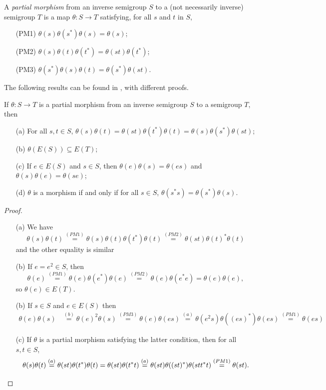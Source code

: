 \begin{definition}\label{definitionpartialmorphism}
A \emph{partial morphism} from an inverse semigroup $S$ to a (not necessarily inverse) semigroup $T$ is a map $\theta: S \rightarrow T$ satisfying, for all $s$ and $t$ in $S$,
\begin{enumerate}
\item[(PM1)] $\theta(s)\theta(s^*)\theta(s)=\theta(s)$;
\item[(PM2)] $\theta(s)\theta(t)\theta(t^*)=\theta(st)\theta(t^*)$;
\item[(PM3)] $\theta(s^*)\theta(s)\theta(t)=\theta(s^*)\theta(st)$.
\end{enumerate}
\end{definition}

The following results can be found in \cite{MR3231479}, with different proofs.

\begin{proposition}\label{propositioninitialpropertiesofpartialmorphisms}
If $\theta:S\to T$ is a partial morphism from an inverse semigroup $S$ to a semigroup $T$, then
\begin{enumerate}
\item[(a)] For all $s,t\in S$, $\theta(s)\theta(t)=\theta(st)\theta(t^*)\theta(t)=\theta(s)\theta(s^*)\theta(st)$;
\item[(b)] $\theta(E(S))\subseteq E(T)$;
\item[(c)] If $e\in E(S)$ and $s\in S$, then $\theta(e)\theta(s)=\theta(es)$ and $\theta(s)\theta(e)=\theta(se)$;
\item[(d)] $\theta$ is a morphism if and only if for all $s\in S$, $\theta(s^*s)=\theta(s^*)\theta(s)$.
\end{enumerate}
\end{proposition}
\begin{proof}
\begin{enumerate}
\item[(a)] We have
\[\theta(s)\theta(t)\overset{(PM1)}{=}\theta(s)\theta(t)\theta(t^*)\theta(t)\overset{(PM2)}=\theta(st)\theta(t)^*\theta(t)\]
and the other equality is similar
\item[(b)]  If $e=e^2\in S$, then
\[\theta(e)\overset{(PM1)}{=}\theta(e)\theta(e^*)\theta(e)\overset{(PM2)}{=}\theta(e)\theta(e^*e)=\theta(e)\theta(e),\]
so $\theta(e)\in E(T)$.
\item[(b)] If $s\in S$ and $e\in E(S)$ then
\begin{align*}
\theta(e)\theta(s)&\overset{(b)}{=}\theta(e)^2\theta(s)\overset{(PM3)}{=}\theta(e)\theta(es)\overset{(a)}{=}\theta(e^2 s)\theta((es)^*)\theta(es)\overset{(PM1)}{=}\theta(es)
\end{align*}
\item[(c)]If $\theta$ is a partial morphism satisfying the latter condition, then for all $s,t\in S$,
\[\theta(s)\theta(t)\overset{(a)}{=}\theta(st)\theta(t^*)\theta(t)=\theta(st)\theta(t^*t)\overset{(a)}{=}\theta(st)\theta((st)^*)\theta(stt^*t)\overset{(PM1)}{=}\theta(st).\qedhere\]
\end{enumerate}
\end{proof}

